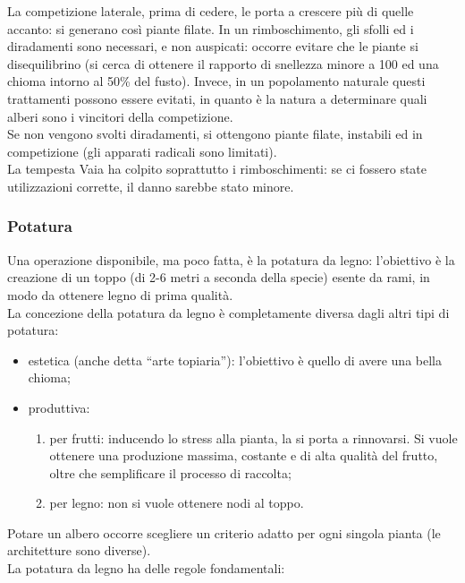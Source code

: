 La competizione laterale, prima di cedere, le porta a crescere più di quelle accanto: si generano così piante filate. In un rimboschimento, gli sfolli ed i diradamenti sono necessari, e non auspicati: occorre evitare che le piante si disequilibrino (si cerca di ottenere il rapporto di snellezza minore a 100 ed una chioma intorno al 50\% del fusto). Invece, in un popolamento naturale questi trattamenti possono essere evitati, in quanto è la natura a determinare quali alberi sono i vincitori della competizione.\\
Se non vengono svolti diradamenti, si ottengono piante filate, instabili ed in competizione (gli apparati radicali sono limitati).\\
La tempesta Vaia ha colpito soprattutto i rimboschimenti: se ci fossero state utilizzazioni corrette, il danno sarebbe stato minore.
\subsubsection{Potatura}
Una operazione disponibile, ma poco fatta, è la potatura da legno: l'obiettivo è la creazione di un toppo (di 2-6 metri a seconda della specie) esente da rami, in modo da ottenere legno di prima qualità.\\
La concezione della potatura da legno è completamente diversa dagli altri tipi di potatura:
\begin{itemize}[nosep]
    \item estetica (anche detta ``arte topiaria''): l'obiettivo è quello di avere una bella chioma;
    \item produttiva:
    \begin{enumerate}[nosep]
        \item per frutti: inducendo lo stress alla pianta, la si porta a rinnovarsi. Si vuole ottenere una produzione massima, costante e di alta qualità del frutto, oltre che semplificare il processo di raccolta;
        \item per legno: non si vuole ottenere nodi al toppo.
    \end{enumerate}
\end{itemize}
Potare un albero occorre scegliere un criterio adatto per ogni singola pianta (le architetture sono diverse).\\
La potatura da legno ha delle regole fondamentali:
